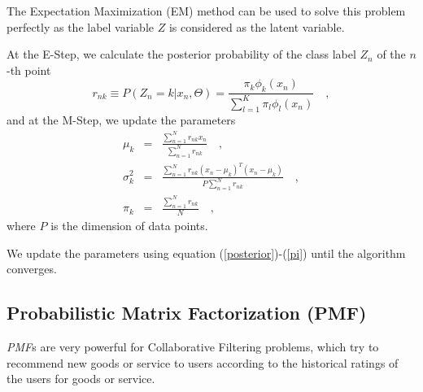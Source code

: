 \documentclass{article}
\newtheorem{algorithm}{Algorithm}
\begin{document}
The Expectation Maximization (EM) method can be used to solve this problem perfectly
as the label variable $Z$ is considered as the latent variable.


At the E-Step, we calculate the posterior probability of the class label $Z_n$
of the $n$-th point
\begin{equation}\label{posterior}
r_{nk} \equiv P(Z_n=k|x_n,\Theta) = \frac{\pi_k \phi_k(x_n)}{\sum_{l=1}^K\pi_l \phi_l(x_n)} \quad ,
\end{equation}
and at the M-Step, we update the parameters
\begin{eqnarray}
\mu_k &=& \frac{\sum_{n=1}^N r_{nk}x_n}{\sum_{n=1}^N r_{nk}} \quad ,\\
\sigma^2_k &=& \frac{\sum_{n=1}^Nr_{nk}(x_n-\mu_k)^T(x_n-\mu_k)}{P\sum_{n=1}^N r_{nk}} \quad,\\
\pi_k &=& \frac{\sum_{n=1}^N r_{nk}}{N} \quad,\label{pi}
\end{eqnarray}
where $P$ is the dimension of data points.

We update the parameters using equation (\ref{posterior})-(\ref{pi}) until the algorithm converges.

\subsection{Probabilistic Matrix Factorization (PMF)}
\textit{PMF}s \cite{Salak2} are very powerful for Collaborative Filtering problems,
which try to recommend new goods or service to users
according to the historical ratings of the users for goods or service.
\end{document}
